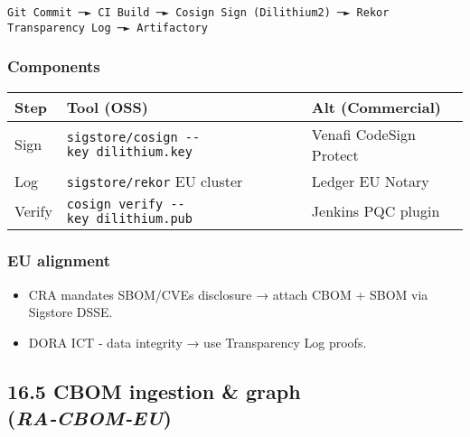 \documentclass[
  english,
]{article}
\providecommand{\tightlist}{%
  \setlength{\itemsep}{0pt}\setlength{\parskip}{0pt}}
\begin{document}
\begin{verbatim}
Git Commit ─► CI Build ─► Cosign Sign (Dilithium2) ─► Rekor Transparency Log ─► Artifactory
\end{verbatim}

\subsubsection{Components}\label{components-2}

\begin{longtable}[]{@{}
  >{\raggedright\arraybackslash}p{}
  >{\raggedright\arraybackslash}p{}
  >{\raggedright\arraybackslash}p{}@{}}
\toprule\noalign{}
\begin{minipage}[b]{\linewidth}\raggedright
Step
\end{minipage} & \begin{minipage}[b]{\linewidth}\raggedright
Tool (OSS)
\end{minipage} & \begin{minipage}[b]{\linewidth}\raggedright
Alt (Commercial)
\end{minipage} \\
\midrule\noalign{}
\endhead
\bottomrule\noalign{}
\endlastfoot
Sign & \texttt{sigstore/cosign\ -\/-key\ dilithium.key} & Venafi
CodeSign Protect \\
Log & \texttt{sigstore/rekor} EU cluster & Ledger EU Notary \\
Verify & \texttt{cosign\ verify\ -\/-key\ dilithium.pub} & Jenkins PQC
plugin \\
\end{longtable}

\subsubsection{EU alignment}\label{eu-alignment}

\begin{itemize}
\tightlist
\item
  CRA mandates SBOM/CVEs disclosure → attach CBOM + SBOM via Sigstore
  DSSE.
\item
  DORA ICT ‑ data integrity → use Transparency Log proofs.
\end{itemize}

\subsection{\texorpdfstring{16.5 CBOM ingestion \& graph
(\emph{RA‑CBOM‑EU})}{16.5 CBOM ingestion \& graph (RA‑CBOM‑EU)}}\label{cbom-ingestion-graph-racbomeu}
\end{document}
